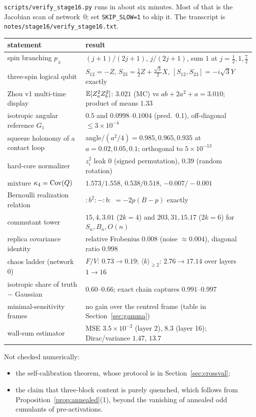 \label{sec:verify}
\texttt{scripts/\allowbreak verify\_\allowbreak stage16.py} runs in about six minutes. Most of that is the Jacobian scan of network~0; set
\texttt{SKIP\_SLOW=1} to skip it. The transcript is \texttt{notes/\allowbreak stage16/\allowbreak verify\_\allowbreak stage16.txt}.
\begin{center}\small
\begin{tabular}{>{\raggedright\arraybackslash}p{5.4cm}>{\raggedright\arraybackslash}p{8.6cm}}\toprule
statement & result\\\midrule
spin branching $p_\pm$ & $(j+1)/(2j+1)$, $j/(2j+1)$, sum $1$ at $j=\frac12,1,\frac72$\\
three-spin logical qubit & $S_{12}=-Z$, $S_{23}=\frac12Z+\frac{\sqrt3}2X$, $[S_{12},S_{23}]=-i\sqrt3Y$ exactly\\
Zhou v1 multi-time display & $\mathbb E[Z_a^2Z_b^2]$: $3.021$ (MC) vs $ab+2a^2+a=3.010$; product of means $1.33$\\
isotropic angular reference $G_1$ & $0.5$ and $0.0998$--$0.1004$ (pred.\ $0.1$), off-diagonal $\le3\times10^{-4}$\\
squeeze holonomy of a contact loop & angle$/(a^2/4)=0.985,0.965,0.935$ at $a=0.02,0.05,0.1$; orthogonal to $5\times10^{-13}$\\
hard-core normalizer & $z_i^2$ leak $0$ (signed permutation), $0.39$ (random rotation)\\
mixture $\kappa_4=\operatorname{Cov}(Q)$ & $1.573/1.558$, $0.538/0.518$, $-0.007/-0.001$\\
Bernoulli realization relation & $:\!b^2\!:-:\!b\!:\;=-2p(B-p)$ exactly\\
commutant tower & $15,4,3.01$ ($2k=4$) and $203,31,15.17$ ($2k=6$) for $S_n,B_n,O(n)$\\
replica covariance identity & relative Frobenius $0.008$ (noise $\approx0.004$), diagonal ratio $0.998$\\
chaos ladder (network 0) & $F/V$: $0.73\to0.19$; $\langle k\rangle_{\ge2}$: $2.76\to17.14$ over layers $1\to16$\\
isotropic share of truth $-$ Gaussian & $0.60$--$0.66$; exact chain captures $0.991$--$0.997$\\
minimal-sensitivity frames & no gain over the centred frame (table in Section~\ref{sec:gamma})\\
wall-sum estimator & MSE $3.5\times10^{-2}$ (layer 2), $8.3$ (layer 16); Dirac/variance $1.47$, $13.7$\\\bottomrule
\end{tabular}
\end{center}
Not checked numerically:
\begin{itemize}[leftmargin=*]
\item the self-calibration theorem, whose protocol is in Section~\ref{sec:crossval};
\item the claim that three-block content is purely quenched, which follows from Proposition~\ref{prop:annealed}(1), beyond the vanishing of annealed
odd cumulants of pre-activations.
\end{itemize}
